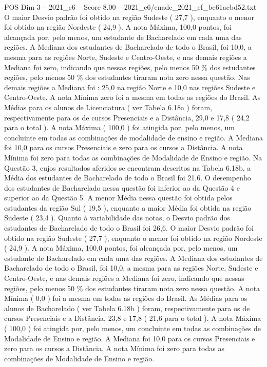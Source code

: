 \begin{textsample}{POS Dim 3 – 2021\_c6 – Score 8.00 – 2021\_c6/enade\_2021\_ef\_be61acbd52.txt}
O maior Desvio padrão foi obtido na região Sudeste ( 27,7 ), enquanto o menor foi obtido na região Nordeste ( 24,9 ).
A nota Máxima, 100,0 pontos, foi alcançada por, pelo menos, um estudante de Bacharelado em cada uma das regiões.
A Mediana dos estudantes de Bacharelado de todo o Brasil, foi 10,0, a mesma para as regiões Norte, Sudeste e Centro-Oeste, e nas demais regiões a Mediana foi zero, indicando que nessas regiões, pelo menos 50 \% dos estudantes regiões, pelo menos 50 \% dos estudantes tiraram nota zero nessa questão.
Nas demais regiões a Mediana foi : 25,0 na região Norte e 10,0 nas regiões Sudeste e Centro-Oeste.
A nota Mínima zero foi a mesma em todas as regiões do Brasil.
As Médias para os alunos de Licenciatura ( ver Tabela 6.18a ) foram, respectivamente para os de cursos Presenciais e a Distância, 29,0 e 17,8 ( 24,2 para o total ).
A nota Máxima ( 100,0 ) foi atingida por, pelo menos, um concluinte em todas as combinações de modalidade de ensino e região.
A Mediana foi 10,0 para os cursos Presenciais e zero para os cursos a Distância.
A nota Mínima foi zero para todas as combinações de Modalidade de Ensino e região.
Na Questão 3, cujos resultados aferidos se encontram descritos na Tabela 6.18b, a Média dos estudantes de Bacharelado de todo o Brasil foi 21,6.
O desempenho dos estudantes de Bacharelado nessa questão foi inferior ao da Questão 4 e superior ao da Questão 5.
A menor Média nessa questão foi obtida pelos estudantes da região Sul ( 19,5 ), enquanto a maior Média foi obtida na região Sudeste ( 23,4 ).
Quanto à variabilidade das notas, o Desvio padrão dos estudantes de Bacharelado de todo o Brasil foi 26,6.
O maior Desvio padrão foi obtido na região Sudeste ( 27,7 ), enquanto o menor foi obtido na região Nordeste ( 24,9 ).
A nota Máxima, 100,0 pontos, foi alcançada por, pelo menos, um estudante de Bacharelado em cada uma das regiões.
A Mediana dos estudantes de Bacharelado de todo o Brasil, foi 10,0, a mesma para as regiões Norte, Sudeste e Centro-Oeste, e nas demais regiões a Mediana foi zero, indicando que nessas regiões, pelo menos 50 \% dos estudantes tiraram nota zero nessa questão.
A nota Mínima ( 0,0 ) foi a mesma em todas as regiões do Brasil.
As Médias para os alunos de Bacharelado ( ver Tabela 6.18b ) foram, respectivamente para os de cursos Presenciais e a Distância, 23,8 e 17,8 ( 21,6 para o total ).
A nota Máxima ( 100,0 ) foi atingida por, pelo menos, um concluinte em todas as combinações de Modalidade de Ensino e região.
A Mediana foi 10,0 para os cursos Presenciais e zero para os cursos a Distância.
A nota Mínima foi zero para todas as combinações de Modalidade de Ensino e região.

\end{textsample}
